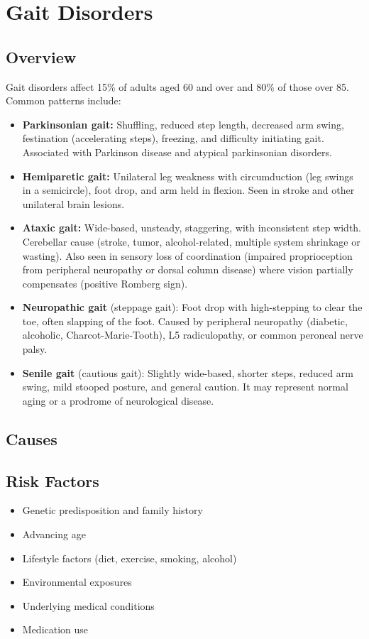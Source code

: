 \chapter{Gait Disorders}
\label{sec:Gait Disorders}

\section{Overview}
Gait disorders affect 15\% of adults aged 60 and over and 80\% of those over 85. Common patterns include:

\begin{itemize}[noitemsep]
  \item \textbf{Parkinsonian gait:} Shuffling, reduced step length, decreased arm swing, festination (accelerating steps), freezing, and difficulty initiating gait. Associated with Parkinson disease and atypical parkinsonian disorders.
  \item \textbf{Hemiparetic gait:} Unilateral leg weakness with circumduction (leg swings in a semicircle), foot drop, and arm held in flexion. Seen in stroke and other unilateral brain lesions.
  \item \textbf{Ataxic gait:} Wide-based, unsteady, staggering, with inconsistent step width. Cerebellar cause (stroke, tumor, alcohol-related, multiple system shrinkage or wasting). Also seen in sensory loss of coordination (impaired proprioception from peripheral neuropathy or dorsal column disease) where vision partially compensates (positive Romberg sign).
  \item \textbf{Neuropathic gait} (steppage gait): Foot drop with high-stepping to clear the toe, often slapping of the foot. Caused by peripheral neuropathy (diabetic, alcoholic, Charcot-Marie-Tooth), L5 radiculopathy, or common peroneal nerve palsy.
  \item \textbf{Senile gait} (cautious gait): Slightly wide-based, shorter steps, reduced arm swing, mild stooped posture, and general caution. It may represent normal aging or a prodrome of neurological disease.
\end{itemize}
\section{Causes}
\section{Risk Factors}

\begin{itemize}[noitemsep]
  \item Genetic predisposition and family history
  \item Advancing age
  \item Lifestyle factors (diet, exercise, smoking, alcohol)
  \item Environmental exposures
  \item Underlying medical conditions
  \item Medication use
\end{itemize}
